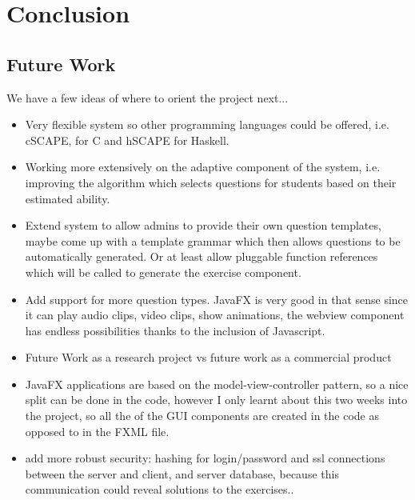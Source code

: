 \chapter{Conclusion}
\section{Future Work}
We have a few ideas of where to orient the project next...

\begin{itemize}
\item Very flexible system so other programming languages could be offered, i.e. cSCAPE, for C and hSCAPE for Haskell. 
\item Working more extensively on the adaptive component of the system, i.e. improving the algorithm which selects questions for students based on their estimated ability.
\item Extend system to allow admins to provide their own question templates, maybe come up with a template grammar which then allows questions to be automatically generated. Or at least allow pluggable function references which will be called to generate the exercise component.
\item Add support for more question types. JavaFX is very good in that sense since it can play audio clips, video clips, show animations, the webview component has endless possibilities thanks to the inclusion of Javascript.
\item Future Work as a research project vs future work as a commercial product
\item JavaFX applications are based on the model-view-controller pattern, so a nice split can be done in the code, however I only learnt about this two weeks into the project, so all the of the GUI components are created in the code as opposed to in the FXML file.
\item add more robust security: hashing for login/password and ssl connections between the server and client, and server database, because this communication could reveal solutions to the exercises..
\end{itemize}